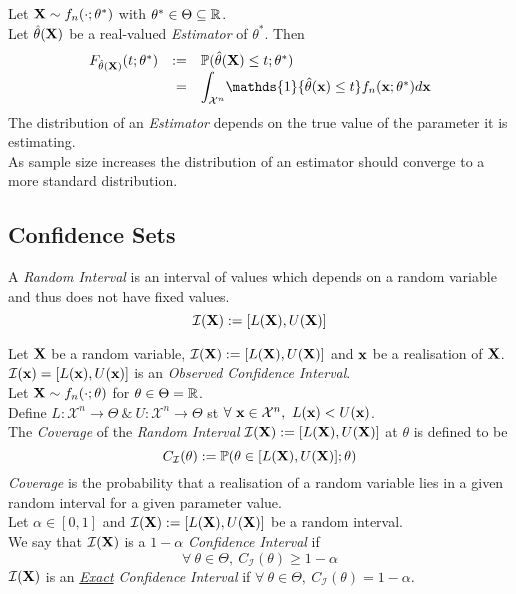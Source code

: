 \documentclass[11pt,a4paper]{article}
\begin{document}
Let $\textbf{X}\sim f_n(\cdot;\theta^*)$ with $\theta^*\in\Theta\subseteq\mathbb{R}$.\\
Let $\hat\theta(\textbf{X})$ be a real-valued \textit{Estimator} of $\theta^*$. Then
\[\begin{array}{rrl}
F_{\hat\theta(\X)}(t;\theta^*)&:=&\prob(\hat\theta(\X)\leq t;\theta^*)\\
&=&{\displaystyle\int_{\mathcal{X}^n}}\mathds{1}\{\hat\theta(\x)\leq t\}f_n(\x;\theta^*)d\x
\end{array}\]
\nb The distribution of an \textit{Estimator} depends on the true value of the parameter it is estimating.\\
\nb As sample size increases the distribution of an estimator should converge to a more standard distribution.

\subsection{Confidence Sets}

A \textit{Random Interval} is an interval of values which depends on a random variable and thus does not have fixed values.
$$\mathcal{I}(\textbf{X}):=[L(\textbf{X}),U(\textbf{X})]$$

Let $\textbf{X}$ be a random variable, $\mathcal{I}(\textbf{X}):=[L(\textbf{X}),U(\textbf{X})]$ and $\textbf{x}$ be a realisation of $\textbf{X}$.\\
$\mathcal{I}(\textbf{x})=[L(\textbf{x}),U(\textbf{x})]$ is an \textit{Observed Confidence Interval}.\\

Let $\textbf{X}\sim f_n(\cdot;\theta)$ for $\theta\in\Theta=\mathbb{R}$.\\
Define $L:\mathcal{X}^n\to\Theta\ \&\ U:\mathcal{X}^n\to\Theta$ st $\forall\ \x\in\mathcal{X}^n,\ L(\x)<U(\x)$.\\
The \textit{Coverage} of the \textit{Random Interval} $\mathcal{I}(\textbf{X}):=[L(\textbf{X}),U(\textbf{X})]$ at $\theta$ is defined to be
$$C_\mathcal{I}(\theta):=\mathbb{P}(\theta\in[L(\textbf{X}),U(\textbf{X})];\theta)$$
\nb \textit{Coverage} is the probability that a realisation of a random variable lies in a given random interval for a given parameter value.\\

Let $\alpha\in[0,1]$ and $\mathcal{I}(\textbf{X}):=[L(\textbf{X}),U(\textbf{X})]$ be a random interval.\\
We say that $\mathcal{I}(\textbf{X})$ is a $1-\alpha$ \textit{Confidence Interval} if
$$\forall\ \theta\in\Theta,\ C_\mathcal{I}(\theta)\geq1-\alpha$$
\nb $\mathcal{I}(\textbf{X})$ is an \textit{\underline{Exact} Confidence Interval} if $\forall\ \theta\in\Theta,\ C_\mathcal{I}(\theta)=1-\alpha$.\\
\end{document}
